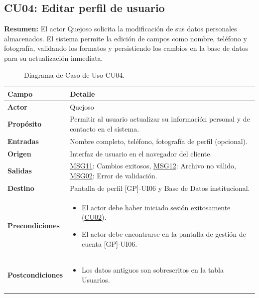 \begin{appendices}
\subsection{CU04: Editar perfil de usuario}

\textbf{Resumen:} 
El actor Quejoso solicita la modificación de sus datos personales almacenados. El sistema permite la edición de campos como nombre, teléfono y fotografía, validando los formatos y persistiendo los cambios en la base de datos para su actualización inmediata.

\begin{figure}[htbp]
    \centering
    \figCUcuatro
    \caption{Diagrama de Caso de Uso CU04.}
    \label{fig:cu04}
\end{figure}

\begin{table}[htbp]
\centering
\small
\begin{tabular}{|p{3.5cm}|p{10.5cm}|}
\hline
\rowcolor[HTML]{EFEFEF} 
\textbf{Campo} & \textbf{Detalle} \\ \hline
\textbf{Actor} & Quejoso \\ \hline
\textbf{Propósito} & Permitir al usuario actualizar su información personal y de contacto en el sistema. \\ \hline
\textbf{Entradas} & Nombre completo, teléfono, fotografía de perfil (opcional). \\ \hline
\textbf{Origen} & Interfaz de usuario en el navegador del cliente. \\ \hline
\textbf{Salidas} & \hyperlink{msg:MSG11}{MSG11}: Cambios exitosos, \hyperlink{msg:MSG12}{MSG12}: Archivo no válido, \hyperlink{msg:MSG02}{MSG02}: Error de validación. \\ \hline
\textbf{Destino} & Pantalla de perfil [GP]-UI06 y Base de Datos institucional. \\ \hline
\textbf{Precondiciones} & 
\begin{itemize}[nosep, leftmargin=*]
    \item El actor debe haber iniciado sesión exitosamente (\hyperlink{anexo:casos_uso}{CU02}).
    \item El actor debe encontrarse en la pantalla de gestión de cuenta [GP]-UI06.
\end{itemize} \\ \hline
\textbf{Postcondiciones} & 
\begin{itemize}[nosep, leftmargin=*]
    \item Los datos antiguos son sobrescritos en la tabla Usuarios.

\end{itemize}
\end{tabular}
\end{table}
\end{appendices}
